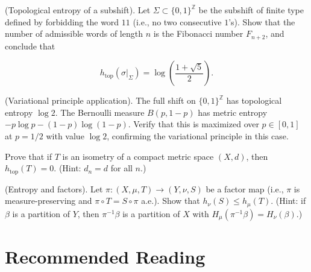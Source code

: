 \begin{exercise}
(Topological entropy of a subshift). Let $\Sigma \subset \{0, 1\}^{\mathbb{Z}}$ be the subshift of finite type defined by forbidding the word $11$ (i.e., no two consecutive $1$'s). Show that the number of admissible words of length $n$ is the Fibonacci number $F_{n+2}$, and conclude that

\[
h_{\mathrm{top}}(\sigma|_\Sigma) = \log\!\left(\frac{1 + \sqrt{5}}{2}\right).
\]
\end{exercise}


\begin{exercise}
(Variational principle application). The full shift on $\{0, 1\}^{\mathbb{Z}}$ has topological entropy $\log 2$. The Bernoulli measure $B(p, 1-p)$ has metric entropy $-p\log p - (1-p)\log(1-p)$. Verify that this is maximized over $p \in [0,1]$ at $p = 1/2$ with value $\log 2$, confirming the variational principle in this case.
\end{exercise}


\begin{exercise}
Prove that if $T$ is an isometry of a compact metric space $(X, d)$, then $h_{\mathrm{top}}(T) = 0$. (Hint: $d_n = d$ for all $n$.)
\end{exercise}


\begin{exercise}
(Entropy and factors). Let $\pi \colon (X, \mu, T) \to (Y, \nu, S)$ be a factor map (i.e., $\pi$ is measure-preserving and $\pi \circ T = S \circ \pi$ a.e.). Show that $h_\nu(S) \leq h_\mu(T)$. (Hint: if $\beta$ is a partition of $Y$, then $\pi^{-1}\beta$ is a partition of $X$ with $H_\mu(\pi^{-1}\beta) = H_\nu(\beta)$.)


\bigskip

\end{exercise}


\section*{Recommended Reading}

